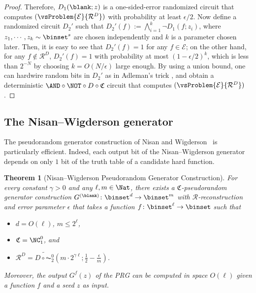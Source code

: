 \documentclass[11pt]{article}
\numberwithin{equation}{section}
\newtheorem{theorem}{Theorem}[section]
\theoremstyle{definition}
\theoremstyle{plain}
\begin{document}
\begin{proof}
  Therefore, $D_1(\blank; z)$ is a one-sided-error randomized circuit that computes $(\vsProblem{\mathcal{E}}{\mathcal{R}^D})$
  with probability at least $\epsilon / 2$.
  Now define a randomized circuit $D_2'$ such that $D_2'(f) := \bigwedge_{i = 1}^k \neg D_1(f; z_i)$,
  where $z_1, \cdots, z_k \sim \binset^s$ are chosen independently and $k$ is a parameter chosen later.
  Then, it is easy to see that $D_2'(f) = 1$ for any $f \in \mathcal{E}$; on the other hand, for any $f \not\in \mathcal{R}^D$,
  $D_2'(f) = 1$ with probability at most $(1 - \epsilon / 2)^k$, which is less than $2^{-N}$ by choosing $k = O(N / \epsilon)$ large enough.
  By using a union bound, one can hardwire random bits in $D_2'$ as in Adleman's trick \cite{Adleman78_focs_conf},
  and obtain a deterministic $\AND \circ \NOT \circ D \circ \mathfrak{C}$ circuit that computes $(\vsProblem{\mathcal{E}}{\mathcal{R}^D})$.
\end{proof}




\subsection{The Nisan--Wigderson generator}
\label{subsection_ReviewNWGenerator}
The pseudorandom generator construction of Nisan and Wigderson~\cite{NisanW94_jcss_journals} is particularly efficient.
Indeed, each output bit of the Nisan--Wigderson generator
depends on only $1$ bit of the truth table of a candidate hard function.

\begin{theorem}
  [Nisan--Wigderson Pseudorandom Generator Construction]
  \label{thm_NWGenerator}
  For every constant $\gamma > 0$ and any $\ell, m \in \Nat$,
  there exists a $\mathfrak{C}$-pseudorandom generator construction $G^{(\blank)} \colon \binset^d \to \binset^m$
  with $\mathcal{R}$-reconstruction and error parameter $\epsilon$
  that takes a function $f \colon \binset^\ell \to \binset$
  such that
  \begin{itemize}
    \item
          $d = O(\ell)$, $m \le 2^\ell$,
    \item
          $\mathfrak{C} = \NC^0_1$, and
    \item
          $\mathcal{R}^D = \widetilde{D \circ \AC^0_2}(m \cdot 2^{\gamma \ell}; \frac{1}{2} - \frac{\epsilon}{m})$.
  \end{itemize}
  Moreover, the output $G^{f}(z)$ of the PRG
  can be computed in space $O(\ell)$
  given a function $f$ and a seed $z$ as input.
\end{theorem}
\end{document}
